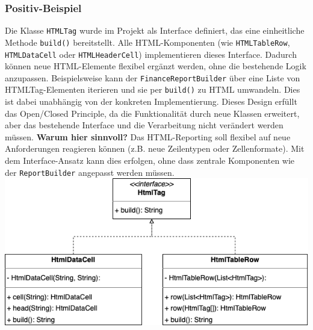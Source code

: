 \subsubsection*{Positiv-Beispiel}
Die Klasse \texttt{HTMLTag} wurde im Projekt als Interface definiert, das eine einheitliche Methode \texttt{build()} bereitstellt. Alle HTML-Komponenten (wie \texttt{HTMLTableRow}, \texttt{HTMLDataCell} oder \texttt{HTMLHeaderCell}) implementieren dieses Interface. Dadurch können neue HTML-Elemente flexibel ergänzt werden, ohne die bestehende Logik anzupassen.
\newline
Beispielsweise kann der \texttt{FinanceReportBuilder} über eine Liste von HTMLTag-Elementen iterieren und sie per \texttt{build()} zu HTML umwandeln. Dies ist dabei unabhängig von der konkreten Implementierung.
\newline
Dieses Design erfüllt das Open/Closed Principle, da die Funktionalität durch neue Klassen erweitert, aber das bestehende Interface und die Verarbeitung nicht verändert werden müssen.
\newline
\textbf{Warum hier sinnvoll?} Das HTML-Reporting soll flexibel auf neue Anforderungen reagieren können (z.B. neue Zeilentypen oder Zellenformate). Mit dem Interface-Ansatz kann dies erfolgen, ohne dass zentrale Komponenten wie der \texttt{ReportBuilder} angepasst werden müssen.
\newline\newline
\includegraphics[width=\linewidth]{kapitel3_solid/positive_ocp.png}

